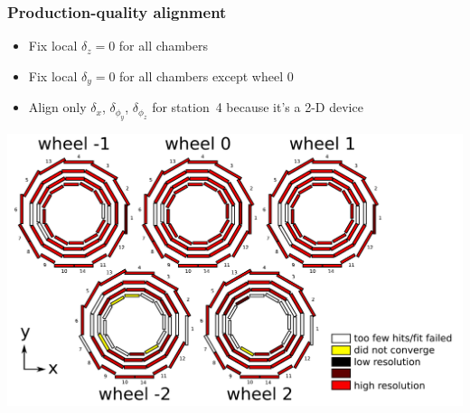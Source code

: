 \documentclass[compress]{beamer}
\begin{document}
\begin{frame}
\frametitle{Production-quality alignment}

\begin{itemize}
\item Fix local $\delta_z = 0$ for all chambers
\item Fix local $\delta_y = 0$ for all chambers except wheel 0
\item Align only $\delta_x$, $\delta_{\phi_y}$, $\delta_{\phi_z}$ for station~4 because it's a 2-D device
\end{itemize}

\includegraphics[width=\linewidth]{data_convergence_optimal.pdf}
\end{frame}
\end{document}
